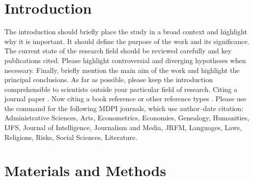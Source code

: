 \documentclass[biotech,article,submit,pdftex,moreauthors]{Definitions/mdpi}
\begin{document}



\section{Introduction}

The introduction should briefly place the study in a broad context and highlight why it is important. It should define the purpose of the work and its significance. The current state of the research field should be reviewed carefully and key publications cited. Please highlight controversial and diverging hypotheses when necessary. Finally, briefly mention the main aim of the work and highlight the principal conclusions. As far as possible, please keep the introduction comprehensible to scientists outside your particular field of research. Citing a journal paper \cite{ref-journal}. Now citing a book reference \cite{ref-book1,ref-book2} or other reference types \cite{ref-unpublish,ref-communication,ref-proceeding}. Please use the command \citep{ref-thesis,ref-url} for the following MDPI journals, which use author--date citation: Administrative Sciences, Arts, Econometrics, Economies, Genealogy, Humanities, IJFS, Journal of Intelligence, Journalism and Media, JRFM, Languages, Laws, Religions, Risks, Social Sciences, Literature.

\section{Materials and Methods}
\end{document}
